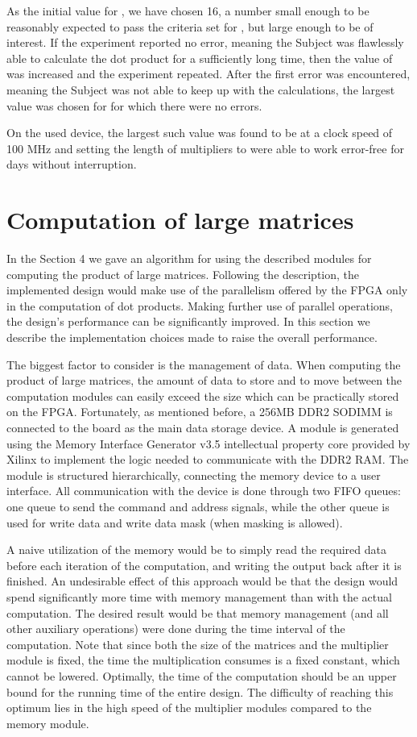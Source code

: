 \documentclass[11pt,twoside]{article}
\begin{document}
As the initial value for , we have chosen 16, a number small enough to be reasonably expected to pass the criteria set for , but large enough to be of interest. If the experiment reported no error, meaning the Subject was flawlessly able to calculate the dot product for a sufficiently long time, then the value of  was increased and the experiment repeated. After the first error was encountered, meaning the Subject was not able to keep up with the calculations, the largest value was chosen for  for which there were no errors.

On the used device, the largest such value was found to be  at a clock speed of 100 MHz and setting the length of  multipliers to  were able to work error-free for days without interruption.

\section{Computation of large matrices}

In the Section 4 we gave an algorithm for using the described modules for computing the product of large matrices. Following the description, the implemented design would make use of the parallelism offered by the FPGA only in the computation of dot products. Making further use of parallel operations, the design's performance can be significantly improved. In this section we describe the implementation choices made to raise the overall performance.

The biggest factor to consider is the management of data. When computing the product of large matrices, the amount of data to store and to move between the computation modules can easily exceed the size which can be practically stored on the FPGA. Fortunately, as mentioned before, a 256MB DDR2 SODIMM is connected to the board as the main data storage device. A module is generated using the Memory Interface Generator v3.5 intellectual property core provided by Xilinx to implement the logic needed to communicate with the DDR2 RAM. The module is structured hierarchically, connecting the memory device to a user interface. All communication with the device is done through two FIFO queues: one queue to send the command and address signals, while the other queue is used for write data and write data mask (when masking is allowed).

A naive utilization of the memory would be to simply read the required data before each iteration of the computation, and writing the output back after it is finished. An undesirable effect of this approach would be that the design would spend significantly more time with memory management than with the actual computation. The desired result would be that memory management (and all other auxiliary operations) were done during the time interval of the computation. Note that since both the size of the matrices and the multiplier module is fixed, the time the multiplication consumes is a fixed constant, which cannot be lowered. Optimally, the time of the computation should be an upper bound for the running time of the entire design. The difficulty of reaching this optimum lies in the high speed of the multiplier modules compared to the memory module.
\end{document}

